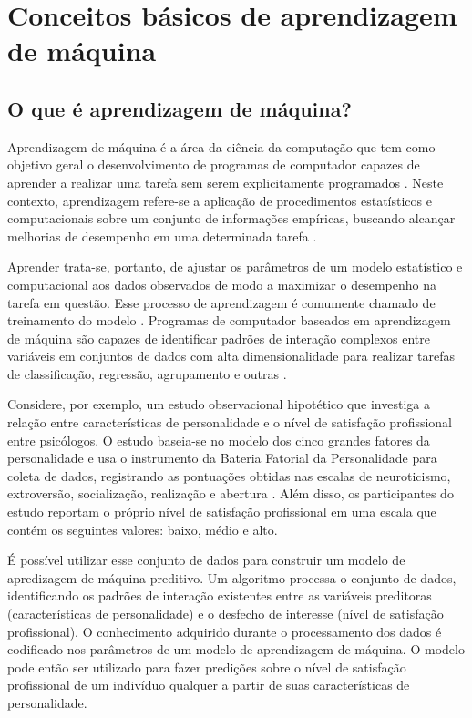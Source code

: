 \chapter{Conceitos básicos de aprendizagem de máquina}

\section{O que é aprendizagem de máquina?}

Aprendizagem de máquina é a área da ciência da computação que tem como objetivo geral o desenvolvimento de programas
de computador capazes de aprender a realizar uma tarefa sem serem explicitamente programados \cite{Bi2019, Theobald2021}.
Neste contexto, aprendizagem refere-se a aplicação de procedimentos estatísticos e computacionais sobre um conjunto
de informações empíricas, buscando alcançar melhorias de desempenho em uma determinada tarefa \cite{Theobald2021}.

Aprender trata-se, portanto, de ajustar os parâmetros de um modelo estatístico e computacional aos dados observados
de modo a maximizar o desempenho na tarefa em questão. Esse processo de aprendizagem é comumente chamado de treinamento
do modelo \cite{Bi2019}. Programas de computador baseados em aprendizagem de máquina são capazes de identificar padrões
de interação complexos entre variáveis em conjuntos de dados com alta dimensionalidade para realizar tarefas de classificação,
regressão, agrupamento e outras \cite{Theobald2021}.

Considere, por exemplo, um estudo observacional hipotético que investiga a relação entre características de personalidade
e o nível de satisfação profissional entre psicólogos. O estudo baseia-se no modelo dos cinco grandes fatores da personalidade
\cite{Hutz2018} e usa o instrumento da Bateria Fatorial da Personalidade para coleta de dados, registrando as pontuações obtidas
nas escalas de neuroticismo, extroversão, socialização, realização e abertura \cite{Sancineto2015}. Além disso, os participantes
do estudo reportam o próprio nível de satisfação profissional em uma escala que contém os seguintes valores: baixo, médio e alto.

É possível utilizar esse conjunto de dados para construir um modelo de apredizagem de máquina preditivo. Um algoritmo processa o conjunto de dados,
identificando os padrões de interação existentes entre as variáveis preditoras (características de personalidade) e o desfecho de interesse (nível
de satisfação profissional). O conhecimento adquirido durante o processamento dos dados é codificado nos parâmetros de um modelo de aprendizagem de
máquina. O modelo pode então ser utilizado para fazer predições sobre o nível de satisfação profissional de um indivíduo qualquer a partir de suas
características de personalidade.

